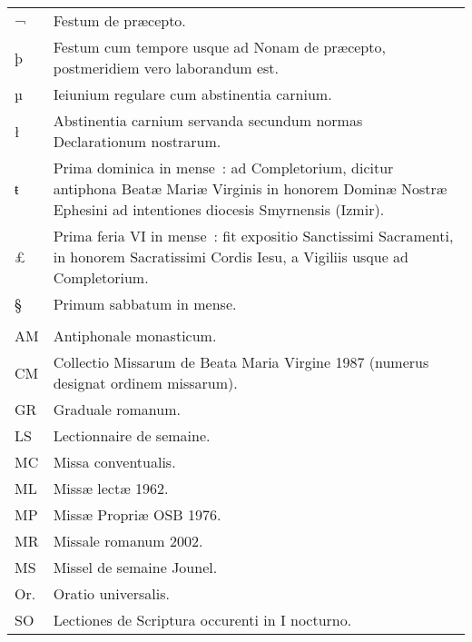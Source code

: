 \begin{tabular}{p{1cm} p{7.5cm}}
¬ & \small{Festum de præcepto.}\\
þ & \small{Festum cum tempore usque ad Nonam de præcepto, postmeridiem vero laborandum est.}\\
µ & \small{Ieiunium regulare cum abstinentia carnium.}\\
ł & \small{Abstinentia carnium servanda secundum normas Declarationum nostrarum.}\\
ŧ & \small{Prima dominica in mense~: ad Completorium, dicitur antiphona Beatæ Mariæ Virginis in honorem Dominæ Nostræ Ephesini ad intentiones diocesis Smyrnensis (Izmir).}\\
£ & \small{Prima feria VI in mense~: ﬁt expositio Sanctissimi Sacramenti, in honorem Sacratissimi Cordis Iesu, a Vigiliis usque ad Completorium.}\\
§ & \small{Primum sabbatum in mense.}\\
 & \\
\small{AM} & \small{Antiphonale monasticum.}\\
\small{CM} & \small{Collectio Missarum de Beata Maria Virgine 1987 (numerus designat ordinem missarum).}\\
\small{GR} & \small{Graduale romanum.}\\
\small{LS} & \small{Lectionnaire de semaine.}\\
\small{MC} & \small{Missa conventualis.}\\
\small{ML} & \small{Missæ lectæ 1962.}\\
\small{MP} & \small{Missæ Propriæ OSB 1976.}\\
\small{MR} & \small{Missale romanum 2002.}\\
\small{MS} & \small{Missel de semaine Jounel.}\\
\small{Or.} & \small{Oratio universalis.}\\
\small{SO} & \small{Lectiones de Scriptura occurenti in I nocturno.}\\
\end{tabular}

\newpage
\thispagestyle{empty}
\setlength{\parskip}{0cm}

